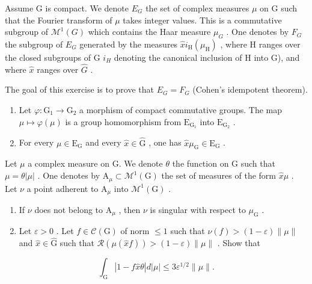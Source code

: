 Assume G is compact. We denote \(E_{G}\) the set of complex measures \(\mu\) on G such that the Fourier transform of \(\mu\) takes integer values. This is a commutative subgroup of \(\mathcal{M}^{1}(G)\) which contains the Haar measure \(\mu_{G}\) . One denotes by \(F_{G}\) the subgroup of \(E_{G}\) generated by the measures \(\widehat{x} i_{\mathrm{H}}(\mu_{\mathrm{H}})\) , where H ranges over the closed subgroups of G \(i_{H}\) denoting the canonical inclusion of H into G), and where \(\widehat{x}\) ranges over \(\widehat{G}\) .

The goal of this exercise is to prove that \(E_{G} = F_{G}\) (Cohen's idempotent theorem).

\begin{enumerate}
\def\labelenumi{\alph{enumi})}
\item
  Let \(\varphi\colon\mathrm{G}_{1}\to\mathrm{G}_{2}\) a morphism of compact commutative groups. The map \(\mu\mapsto\varphi(\mu)\) is a group homomorphism from \(\mathrm{E}_{\mathrm{G}_{1}}\) into \(\mathrm{E}_{\mathrm{G}_{2}}\) .
\item
  For every \(\mu \in \mathrm{E}_{\mathrm{G}}\) and every \(\widehat{x} \in \widehat{\mathrm{G}}\) , one has \(\widehat{x}\mu_{\mathrm{G}} \in \mathrm{E}_{\mathrm{G}}\) .
\end{enumerate}

Let \(\mu\) a complex measure on G. We denote \(\theta\) the function on G such that \(\mu = \theta |\mu|\) . One denotes by \(\mathrm{A}_{\mu} \subset \mathcal{M}^{1}(\mathrm{G})\) the set of measures of the form \(\widehat{x}\mu\) . Let \(\nu\) a point adherent to \(\mathrm{A}_{\mu}\) into \(\mathcal{M}^{1}(\mathrm{G})\) .

\begin{enumerate}
\def\labelenumi{\alph{enumi})}
\setcounter{enumi}{2}
\tightlist
\item
  If \(\nu\) does not belong to \(\mathrm{A}_{\mu}\) , then \(\nu\) is singular with respect to \(\mu_{\mathrm{G}}\) .\\
\item
  Let \(\varepsilon > 0\) . Let \(f \in \mathcal{C}(\mathrm{G})\) of norm \(\leqslant 1\) such that \(\nu(f) > (1 - \varepsilon)\|\mu\|\) and \(\widehat{x} \in \widehat{\mathrm{G}}\) such that \(\mathcal{R}(\mu(\widehat{x} f)) > (1 - \varepsilon)\|\mu\|\) . Show that
\end{enumerate}

\[
\int_ {\mathrm{G}} | 1 - f \widehat {x} \theta | d | \mu | \leqslant 3 \varepsilon^ {1 / 2} \| \mu \|.
\]

